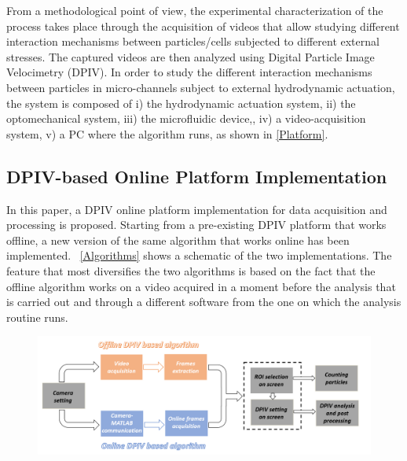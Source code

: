 \documentclass[journal]{IEEEtran}
\theoremstyle{definition}
\theoremstyle{remark}
\begin{document}
From a methodological point of view, the experimental characterization of the process takes place through the acquisition of videos that allow studying different interaction mechanisms between particles/cells subjected to different external stresses.
The captured videos are then analyzed using Digital Particle Image Velocimetry (DPIV).
In order to study the different interaction mechanisms between particles in micro-channels subject to external hydrodynamic actuation, the system is composed of i) the hydrodynamic actuation system, ii) the optomechanical system, iii) the microfluidic device,, iv) a video-acquisition system, v)  a PC where the algorithm runs, as shown in \fig\ref{Platform}.


\subsection{DPIV-based Online Platform Implementation}\label{sec:method}

In this paper, a DPIV online platform implementation for data acquisition and processing is proposed. Starting from a pre-existing DPIV platform that works offline, a new version of the same algorithm
that works online has been implemented. ~\fig\ref{Algorithms} shows a schematic of the two implementations. The feature that most diversifies the two algorithms is based on the fact that the offline algorithm works on a video acquired in a moment before the analysis that is carried out and through a different software from the one on which the analysis routine runs.



\begin{figure}[t]
	\centering
	\includegraphics[width=1\columnwidth]{images/Algorithms}
\end{figure}
\end{document}
